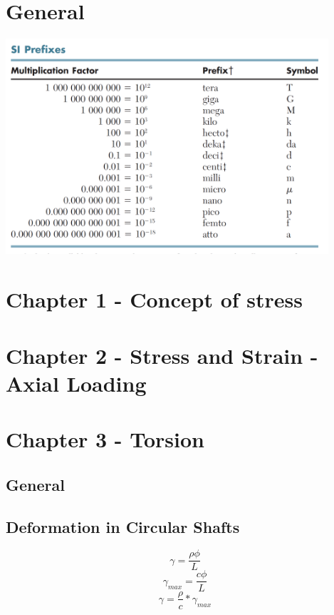 \documentclass[10pt,landscape]{article}
\newenvironment{Figure}
     {\par\medskip\noindent\minipage{\linewidth}}
     {\endminipage\par\medskip}
\begin{document}
\begin{multicols}{3}
\section{General}
\begin{Figure}
    \centering
    \includegraphics[width=\linewidth, height=8cm]{SI_Prefix.png}
\end{Figure}
\section{Chapter 1 - Concept of stress}

\section{Chapter 2 - Stress and Strain - Axial Loading}

\section{Chapter 3 - Torsion}
\subsection{General}
\subsection{Deformation in Circular Shafts}
\begin{equation}
    \gamma=\frac{\rho\phi}{L}
\end{equation}
\begin{equation}
    \gamma_{max}=\frac{c\phi}{L}
\end{equation}
\begin{equation}
    \gamma=\frac{\rho}{c}*\gamma_{max}
\end{equation}

\end{multicols}
\end{document}
